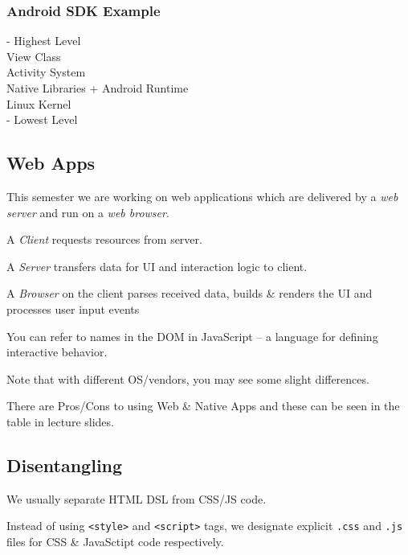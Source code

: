 \subsubsection{Android SDK Example}
- Highest Level\\
View Class\\
Activity System\\
Native Libraries + Android Runtime\\
Linux Kernel\\
- Lowest Level

\subsection{Web Apps}
This semester we are working on web applications which are delivered by a \textit{web server} and run on a \textit{web browser}.

\begin{shaded}
A \textit{Client} requests resources from  server.
\end{shaded}

\begin{shaded}
A \textit{Server} transfers data for UI and interaction logic to client.
\end{shaded}

\begin{shaded}
A \textit{Browser} on the client parses received data, builds \& renders the UI and processes user input events
\end{shaded}

You can refer to names in the DOM in JavaScript -- a language for defining interactive behavior.

Note that with different OS/vendors, you may see some slight differences.

There are Pros/Cons to using Web \& Native Apps and these can be seen in the table in lecture slides.

\subsection{Disentangling}
We usually separate HTML DSL from CSS/JS code.

Instead of using \texttt{<style>} and \texttt{<script>} tags, we designate explicit \texttt{.css} and \texttt{.js} files for CSS \& JavaSctipt code respectively.

